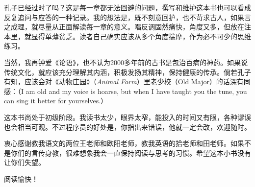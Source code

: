 孔子已经过时了吗？这是每一章都无法回避的问题，撰写和维护这本书也可以看成反复追问与应答的一种记录。我的想法是，既不刻意回护，也不苛求古人，如果言之成理，就尽量从正面解读每一章的意义。唱反调固然痛快，角度又多，但放在注本里，就显得单薄贫乏。读者自己确实应该从多个角度揣摩，作为必不可少的思维练习。

当然，我再钟爱《论语》，也不认为2000多年前的古书是包治百病的神药。如果说传统文化，就应该充分理解其内涵，积极发扬其精神，保持健康的传承。倘若孔子有知，应该会对《动物庄园》（\emph{Animal Farm}）里老少校（Old Major）的话深有同感：（I am old and my voice is hoarse, but when I have taught you the tune, you can sing it better for yourselves.）

这本书尚处于初级阶段。我读书太少，眼界太窄，能投入的时间又有限，各种谬误也会相当可观。不过程序员的好处是，你指出来错误，他就一定会改，欢迎随时。

衷心感谢教我语文的两位王老师和欧阳老师，教我英语的拾老师和田老师。如果不是你们的言传身教，很难想象我会一直保持阅读与思考的习惯。希望这本小书没有让你们失望。

\noindent\begin{center}阅读愉快！\end{center}

